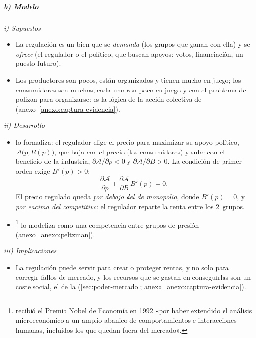 \documentclass[11pt]{article}
\begin{document}
\subparagraph{b) Modelo}

\hspace*{3.6em}\emph{i) Supuestos}

\begin{itemize}
\item La regulación es un bien que se \emph{demanda} (los grupos que ganan con ella) y se \emph{ofrece} (el regulador o el político, que buscan apoyos: votos, financiación, un puesto futuro).
\item Los productores son pocos, están organizados y tienen mucho en juego; los consumidores son muchos, cada uno con poco en juego y con el problema del polizón para organizarse: es la lógica de la acción colectiva de \textcite{Olson1965Logic}  (anexo~\ref{anexo:captura-evidencia}).
\end{itemize}

\hspace*{3.6em}\emph{ii) Desarrollo}

\begin{itemize}
\item \textcite{Peltzman1976Toward} lo formaliza: el regulador elige el precio para maximizar su apoyo político, $\mathcal{A}\big(p,B(p)\big)$, que baja con el precio (los consumidores) y sube con el beneficio de la industria, $\partial\mathcal{A}/\partial p<0$ y $\partial\mathcal{A}/\partial B>0$. La condición de primer orden exige $B'(p)>0$:
  \[
  \frac{\partial\mathcal{A}}{\partial p}+\frac{\partial\mathcal{A}}{\partial B}\,B'(p)=0.
  \]
  El precio regulado queda \emph{por debajo del de monopolio}, donde $B'(p)=0$, y \emph{por encima del competitivo}: el regulador reparte la renta entre los 2~grupos.
\item \textcite{Becker1983Theory}\footnote{ recibió el Premio Nobel de Economía en 1992 «por haber extendido el análisis microeconómico a un amplio abanico de comportamientos e interacciones humanas, incluidos los que quedan fuera del mercado»\nocite{Nobel1992Becker}.} lo modeliza como una competencia entre grupos de presión (anexo~\ref{anexo:peltzman}).
\end{itemize}

\hspace*{3.6em}\emph{iii) Implicaciones}

\begin{itemize}
\item La regulación puede servir para crear o proteger rentas, y no solo para corregir fallos de mercado, y los recursos que se gastan en conseguirlas son un coste social, el de la \nocite{Tullock1967Welfare,Krueger1974Political} (\ref{sec:poder-mercado}; anexo~\ref{anexo:captura-evidencia}).
\end{itemize}
\end{document}
